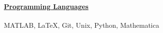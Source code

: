 \documentclass[letterpaper,11pt,oneside]{article}
\newcommand{\headr}[1]{\vspace{10pt}\uline{\Large{\textbf{#1}} \hfill } \\ \vspace{-10pt}\\}
\begin{document}
\headr{Programming Languages}

MATLAB, \LaTeX, Git, Unix, Python, Mathematica\\



\end{document}
